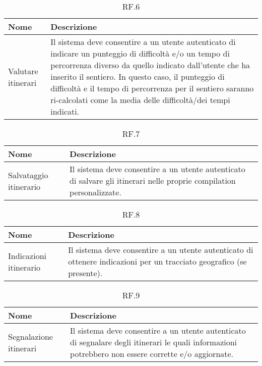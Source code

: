 \documentclass{natourDoc}
\begin{document}
	\begin{table}[H]
		\centering
		\begin{tabular}{ |p{5cm}|p{10.3cm}| } 
			\hline
			\rowcolor{PineGreen!70}
			\textbf{Nome} & \textbf{Descrizione} \\
			\hline
			Valutare itinerari & Il sistema deve consentire a un utente autenticato di indicare un punteggio di difficoltà e/o un tempo
			di percorrenza diverso da quello indicato dall’utente che ha inserito il sentiero. In questo caso, il
			punteggio di difficoltà e il tempo di percorrenza per il sentiero saranno ri-calcolati come la media
			delle difficoltà/dei tempi indicati.\\ 
			\hline
		\end{tabular}
		\caption{RF.6}
		\label{table:6}
	\end{table}
	
	\begin{table}[H]
		\centering
		\begin{tabular}{ |p{5cm}|p{10.3cm}| }
			\hline
			\rowcolor{PineGreen!70}
			\textbf{Nome} & \textbf{Descrizione} \\
			\hline
			Salvataggio itinerario & Il sistema deve consentire a un utente autenticato di salvare gli itinerari
			nelle proprie compilation personalizzate. \\
			\hline
		\end{tabular}
		\caption{RF.7}
		\label{table:7}
	\end{table}

	\begin{table}[H]
		\centering
		\begin{tabular}{ |p{5cm}|p{10.3cm}| }
			\hline
			\rowcolor{PineGreen!70}
			\textbf{Nome} & \textbf{Descrizione} \\
			\hline
			Indicazioni itinerario & Il sistema deve consentire a un utente autenticato di ottenere indicazioni
			per un tracciato geografico (se presente). \\
			\hline
		\end{tabular}
		\caption{RF.8}
		\label{table:8}
	\end{table}

	\begin{table}[H]
		\centering
		\begin{tabular}{ |p{5cm}|p{10.3cm}| }
			\hline
			\rowcolor{PineGreen!70}
			\textbf{Nome} & \textbf{Descrizione} \\
			\hline
			Segnalazione itinerari & Il sistema deve consentire a un utente autenticato di segnalare degli itinerari
			le quali informazioni potrebbero non essere corrette e/o aggiornate. \\
			\hline
		\end{tabular}
		\caption{RF.9}
		\label{table:9}
	\end{table}
\end{document}
